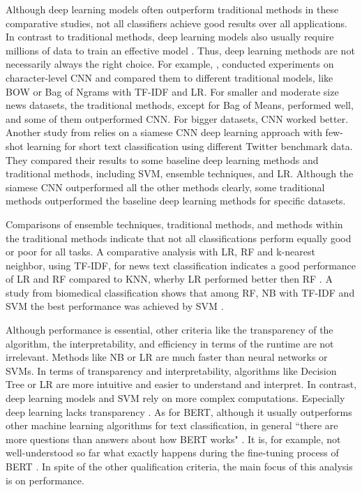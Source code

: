 \documentclass[12pt, a4paper, titlepage]{article}
\begin{document}
Although deep learning models often outperform traditional methods in these comparative studies, not all classifiers achieve good results over all applications. In contrast to traditional methods, deep learning models also usually require millions of data to train an effective model \citep{chauhan2018}. Thus, deep learning methods are not necessarily always the right choice. For example, \citet{zhang2015}, conducted experiments on character-level \ac{CNN} and compared them to different traditional models, like \ac{BOW} or Bag of Ngrams with \ac{TF-IDF} and \ac{LR}. For smaller and moderate size news datasets, the traditional methods, except for Bag of Means, performed well, and some of them outperformed \ac{CNN}. For bigger datasets, \ac{CNN} worked better. Another study from \citet{yan2018} relies on a siamese \ac{CNN} deep learning approach with few-shot learning for short text classification using different Twitter benchmark data. They compared their results to some baseline deep learning methods and traditional methods, including \ac{SVM}, ensemble techniques, and \ac{LR}. Although the siamese \ac{CNN} outperformed all the other methods clearly, some traditional methods outperformed the baseline deep learning methods for specific datasets.  

Comparisons of ensemble techniques, traditional methods, and methods within the traditional methods indicate that not all classifications perform equally good or poor for all tasks. A comparative analysis with \ac{LR}, \ac{RF} and k-nearest neighbor, using \ac{TF-IDF}, for news text classification indicates a good performance of \ac{LR} and \ac{RF} compared to \ac{KNN}, wherby \ac{LR} performed better then \ac{RF} \citep{shah2020}. A study from biomedical classification shows that among \ac{RF}, \ac{NB} with \ac{TF-IDF} and \ac{SVM} the best performance was achieved by \ac{SVM} \citep{danso2014}. 

Although performance is essential, other criteria like the transparency of the algorithm, the interpretability, and efficiency in terms of the runtime are not irrelevant. Methods like \ac{NB} or \ac{LR} are much faster than neural networks or \ac{SVM}s. In terms of transparency and interpretability, algorithms like Decision Tree or \ac{LR} are more intuitive and easier to understand and interpret. In contrast, deep learning models and \ac{SVM} rely on more complex computations. Especially deep learning lacks transparency \citep{maglogiannis2007}. As for \ac{BERT}, although it usually outperforms other machine learning algorithms for text classification, in general ``there are more questions than answers about how \ac{BERT} works" \citep[853]{rogers2020}. It is, for example, not well-understood so far what exactly happens during the fine-tuning process of \ac{BERT} \citep{merchant2020}. In spite of the other qualification criteria, the main focus of this analysis is on performance. 
\end{document}
